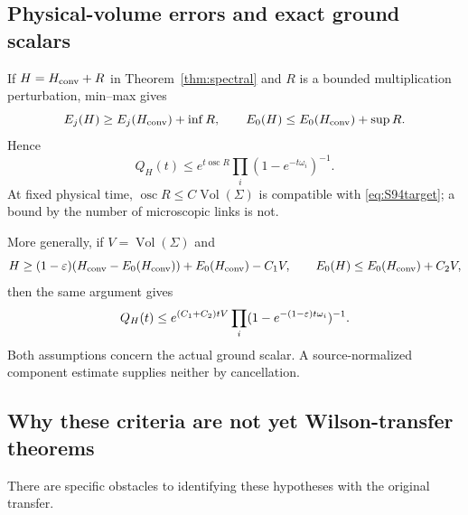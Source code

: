 \documentclass[11pt,letterpaper]{article}
\numberwithin{equation}{section}
\theoremstyle{definition}\newtheorem{definition}[theorem]{Definition}
\theoremstyle{remark}\newtheorem{remark}[theorem]{Remark}
\newcommand{\osc}{\operatorname{osc}}\newcommand{\dd}{\mathrm d}
\begin{document}
\subsection{Physical-volume errors and exact ground scalars}

If $H=H_{\rm conv}+R$ in Theorem~\ref{thm:spectral} and $R$ is a bounded multiplication perturbation, min--max gives
\[
 E_j(H)\ge E_j(H_{\rm conv})+\inf R,\qquad
 E_0(H)\le E_0(H_{\rm conv})+\sup R.
\]
Hence
\begin{equation}
 Q_H(t)\le e^{t\osc R}\prod_i(1-e^{-t\omega_i})^{-1}.
 \label{eq:oscillation}
\end{equation}
At fixed physical time, $\osc R\le C\operatorname{Vol}(\Sigma)$ is compatible with \eqref{eq:S94target}; a bound by the number of microscopic links is not.

More generally, if $V=\operatorname{Vol}(\Sigma)$ and
\[
 H\ge(1-\varepsilon)(H_{\rm conv}-E_0(H_{\rm conv}))
       +E_0(H_{\rm conv})-C_1V,
 \qquad E_0(H)\le E_0(H_{\rm conv})+C_2V,
\]
then the same argument gives
\[
 Q_H(t)\le e^{(C_1+C_2)tV}
             \prod_i(1-e^{-(1-\varepsilon)t\omega_i})^{-1}.
\]
Both assumptions concern the actual ground scalar. A source-normalized component estimate supplies neither by cancellation.

\subsection{Why these criteria are not yet Wilson-transfer theorems}

There are specific obstacles to identifying these hypotheses with the original transfer.
\end{document}
